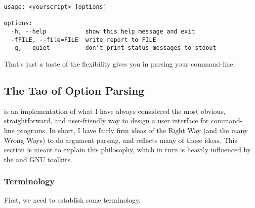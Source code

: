 \begin{verbatim}
usage: <yourscript> [options]

options:
  -h, --help           show this help message and exit
  -fFILE, --file=FILE  write report to FILE
  -q, --quiet          don't print status messages to stdout
\end{verbatim}

That's just a taste of the flexibility  gives you in
parsing your command-line.

\subsection{The Tao of Option Parsing\label{optparse-tao}}

 is an implementation of what I have always
considered the most obvious, straightforward, and user-friendly way to
design a user interface for command-line programs.  In short, I have
fairly firm ideas of the Right Way (and the many Wrong Ways) to do
argument parsing, and  reflects many of those ideas.
This section is meant to explain this philosophy, which in turn is
heavily influenced by the \UNIX{} and GNU toolkits.

\subsubsection{Terminology\label{optparse-terminology}}

First, we need to establish some terminology.

